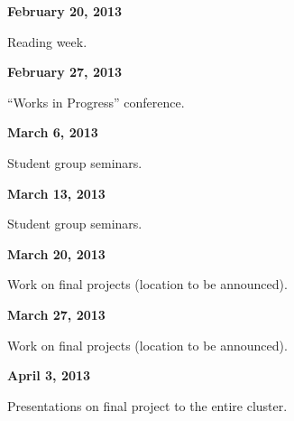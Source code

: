 \documentclass[12pt]{article}
\begin{document}
\textbf{February 20, 2013}

Reading week.

\newpage

\textbf{February 27, 2013}

``Works in Progress'' conference. 

\textbf{March 6, 2013}

Student group seminars.

\textbf{March 13, 2013}

Student group seminars.

\textbf{March 20, 2013}

Work on final projects (location to be announced).

\textbf{March 27, 2013}

Work on final projects (location to be announced).

\textbf{April 3, 2013}

Presentations on final project to the entire cluster.

\newpage
\end{document}
